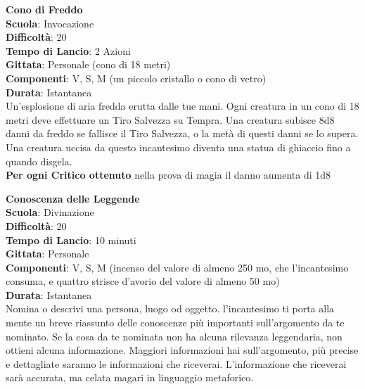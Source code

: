 \begin{multicols}{2}
\medskip\textbf{Cono di Freddo}\\
\textbf{Scuola}: Invocazione\\
\textbf{Difficoltà}:  20\\
\textbf{Tempo di Lancio}: 2 Azioni\\
\textbf{Gittata}: Personale (cono di 18 metri)\\
\textbf{Componenti}: V, S, M (un piccolo cristallo o cono di vetro)\\
\textbf{Durata}: Istantanea\\
Un'esplosione di aria fredda erutta dalle tue mani. Ogni creatura in un cono di 18 metri deve effettuare un Tiro Salvezza su Tempra. Una creatura subisce 8d8 danni da freddo se fallisce il Tiro Salvezza, o la metà di questi danni se lo supera. Una creatura uccisa da questo incantesimo diventa una statua di ghiaccio fino a quando disgela.\\
\textbf{Per ogni Critico ottenuto} nella prova di magia il danno aumenta di 1d8

\medskip\textbf{Conoscenza delle Leggende}\\
\textbf{Scuola}: Divinazione\\
\textbf{Difficoltà}:  20\\
\textbf{Tempo di Lancio}: 10 minuti\\
\textbf{Gittata}: Personale\\
\textbf{Componenti}: V, S, M (incenso del valore di almeno 250 mo, che l'incantesimo consuma, e quattro strisce d’avorio del valore di almeno 50 mo)\\
\textbf{Durata}: Istantanea\\
Nomina o descrivi una persona, luogo od oggetto. l'incantesimo ti porta alla mente un breve riassunto delle conoscenze più importanti sull'argomento da te nominato. Se la cosa da te nominata non ha alcuna rilevanza leggendaria, non ottieni alcuna informazione. Maggiori informazioni hai sull'argomento, più precise e dettagliate saranno le informazioni che riceverai. L’informazione che riceverai sarà accurata, ma celata magari in linguaggio metaforico.


\end{multicols}
